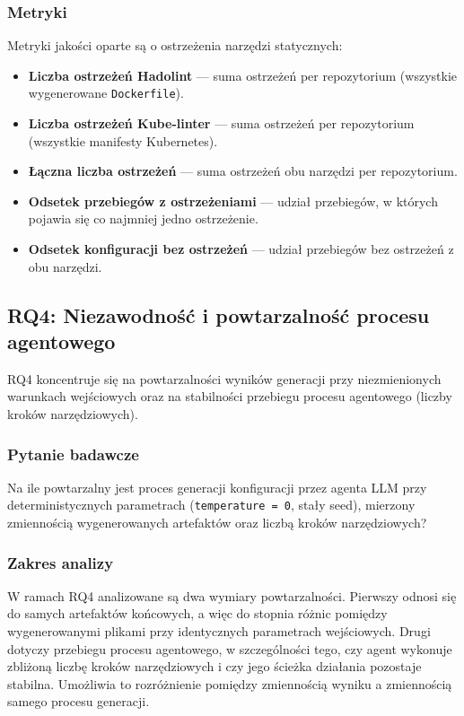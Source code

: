 \subsubsection{Metryki}

Metryki jakości oparte są o ostrzeżenia narzędzi statycznych:
\begin{itemize}
    \item \textbf{Liczba ostrzeżeń Hadolint} — suma ostrzeżeń per repozytorium (wszystkie wygenerowane \texttt{Dockerfile}).
    \item \textbf{Liczba ostrzeżeń Kube-linter} — suma ostrzeżeń per repozytorium (wszystkie manifesty Kubernetes).
    \item \textbf{Łączna liczba ostrzeżeń} — suma ostrzeżeń obu narzędzi per repozytorium.
    \item \textbf{Odsetek przebiegów z ostrzeżeniami} — udział przebiegów, w których pojawia się co najmniej jedno ostrzeżenie.
    \item \textbf{Odsetek konfiguracji bez ostrzeżeń} — udział przebiegów bez ostrzeżeń z obu narzędzi.
\end{itemize}

\subsection{RQ4: Niezawodność i powtarzalność procesu agentowego}
\label{sec:rq4-design}

RQ4 koncentruje się na powtarzalności wyników generacji przy niezmienionych warunkach wejściowych oraz na stabilności przebiegu procesu agentowego (liczby kroków narzędziowych).

\subsubsection{Pytanie badawcze}

Na ile powtarzalny jest proces generacji konfiguracji przez agenta LLM przy deterministycznych parametrach (\texttt{temperature = 0}, stały seed), mierzony zmiennością wygenerowanych artefaktów oraz liczbą kroków narzędziowych?

\subsubsection{Zakres analizy}

W ramach RQ4 analizowane są dwa wymiary powtarzalności. Pierwszy odnosi się do samych artefaktów końcowych, a więc do stopnia różnic pomiędzy wygenerowanymi plikami przy identycznych parametrach wejściowych. Drugi dotyczy przebiegu procesu agentowego, w szczególności tego, czy agent wykonuje zbliżoną liczbę kroków narzędziowych i czy jego ścieżka działania pozostaje stabilna. Umożliwia to rozróżnienie pomiędzy zmiennością wyniku a zmiennością samego procesu generacji.

